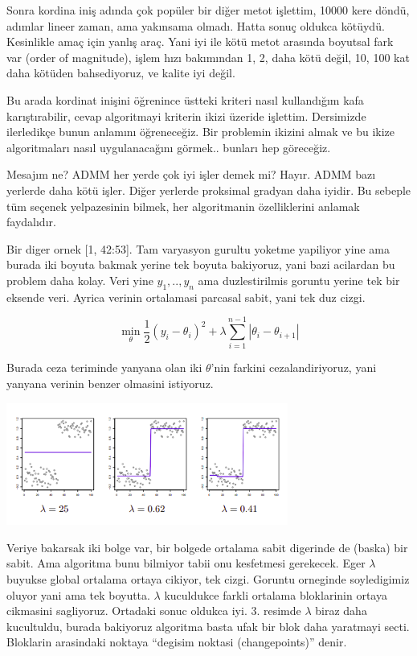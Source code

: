 \documentclass[12pt,fleqn]{article}\usepackage{../../common}
\begin{document}
Sonra kordina iniş adında çok popüler bir diğer metot işlettim, 10000 kere
döndü, adımlar lineer zaman, ama yakınsama olmadı. Hatta sonuç oldukca
kötüydü. Kesinlikle amaç için yanlış araç. Yani iyi ile kötü metot arasında
boyutsal fark var (order of magnitude), işlem hızı bakımından 1, 2, daha
kötü değil, 10, 100 kat daha kötüden bahsediyoruz, ve kalite iyi değil.

Bu arada kordinat inişini öğrenince üstteki kriteri nasıl kullandığım kafa
karıştırabilir, cevap algoritmayi kriterin ikizi üzeride
işlettim. Dersimizde ilerledikçe bunun anlamını öğreneceğiz. Bir problemin
ikizini almak ve bu ikize algoritmaları nasıl uygulanacağını
görmek.. bunları hep göreceğiz. 

Mesajım ne? ADMM her yerde çok iyi işler demek mi? Hayır. ADMM bazı
yerlerde daha kötü işler. Diğer yerlerde proksimal gradyan daha iyidir. Bu
sebeple tüm seçenek yelpazesinin bilmek, her algoritmanin özelliklerini
anlamak faydalıdır. 

Bir diger ornek [1, 42:53]. Tam varyasyon gurultu yoketme yapiliyor yine
ama burada iki boyuta bakmak yerine tek boyuta bakiyoruz, yani bazi
acilardan bu problem daha kolay. Veri yine $y_1,..,y_n$ ama duzlestirilmis
goruntu yerine tek bir eksende veri. Ayrica verinin ortalamasi parcasal
sabit, yani tek duz cizgi. 

$$
\min_\theta \frac{1}{2} (y_i-\theta_i)^2 + 
\lambda \sum _{i=1}^{n-1} |\theta_i - \theta_{i+1}|
$$

Burada ceza teriminde yanyana olan iki $\theta$'nin farkini
cezalandiriyoruz, yani yanyana verinin benzer olmasini istiyoruz. 

\includegraphics[width=25em]{func_19_intro_02.png}

Veriye bakarsak iki bolge var, bir bolgede ortalama sabit digerinde de
(baska) bir sabit. Ama algoritma bunu bilmiyor tabii onu kesfetmesi
gerekecek. Eger $\lambda$ buyukse global ortalama ortaya cikiyor, tek
cizgi. Goruntu orneginde soyledigimiz oluyor yani ama tek
boyutta. $\lambda$ kuculdukce farkli ortalama bloklarinin ortaya cikmasini
sagliyoruz. Ortadaki sonuc oldukca iyi. 3. resimde $\lambda$ biraz daha
kucultuldu, burada bakiyoruz algoritma basta ufak bir blok daha yaratmayi
secti. Bloklarin arasindaki noktaya ``degisim noktasi (changepoints)''
denir. 
\end{document}
